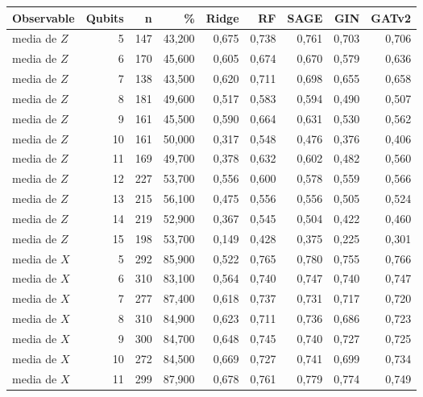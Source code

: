 \begin{table}[htbp]
    \centering
    {\footnotesize
    \begin{tabular}{@{}lrrrrrrrr@{}}
        \toprule
        \textbf{Observable} & \textbf{Qubits} & \textbf{n} & \textbf{\%} & \textbf{Ridge} & \textbf{RF} & \textbf{SAGE} & \textbf{GIN} & \textbf{GATv2} \\
        \midrule
        media de $Z$ & 5 & 147 & 43,200 & 0,675 & 0,738 & 0,761 & 0,703 & 0,706 \\
        media de $Z$ & 6 & 170 & 45,600 & 0,605 & 0,674 & 0,670 & 0,579 & 0,636 \\
        media de $Z$ & 7 & 138 & 43,500 & 0,620 & 0,711 & 0,698 & 0,655 & 0,658 \\
        media de $Z$ & 8 & 181 & 49,600 & 0,517 & 0,583 & 0,594 & 0,490 & 0,507 \\
        media de $Z$ & 9 & 161 & 45,500 & 0,590 & 0,664 & 0,631 & 0,530 & 0,562 \\
        media de $Z$ & 10 & 161 & 50,000 & 0,317 & 0,548 & 0,476 & 0,376 & 0,406 \\
        media de $Z$ & 11 & 169 & 49,700 & 0,378 & 0,632 & 0,602 & 0,482 & 0,560 \\
        media de $Z$ & 12 & 227 & 53,700 & 0,556 & 0,600 & 0,578 & 0,559 & 0,566 \\
        media de $Z$ & 13 & 215 & 56,100 & 0,475 & 0,556 & 0,556 & 0,505 & 0,524 \\
        media de $Z$ & 14 & 219 & 52,900 & 0,367 & 0,545 & 0,504 & 0,422 & 0,460 \\
        media de $Z$ & 15 & 198 & 53,700 & 0,149 & 0,428 & 0,375 & 0,225 & 0,301 \\
        media de $X$ & 5 & 292 & 85,900 & 0,522 & 0,765 & 0,780 & 0,755 & 0,766 \\
        media de $X$ & 6 & 310 & 83,100 & 0,564 & 0,740 & 0,747 & 0,740 & 0,747 \\
        media de $X$ & 7 & 277 & 87,400 & 0,618 & 0,737 & 0,731 & 0,717 & 0,720 \\
        media de $X$ & 8 & 310 & 84,900 & 0,623 & 0,711 & 0,736 & 0,686 & 0,723 \\
        media de $X$ & 9 & 300 & 84,700 & 0,648 & 0,745 & 0,740 & 0,727 & 0,725 \\
        media de $X$ & 10 & 272 & 84,500 & 0,669 & 0,727 & 0,741 & 0,699 & 0,734 \\
        media de $X$ & 11 & 299 & 87,900 & 0,678 & 0,761 & 0,779 & 0,774 & 0,749 \\

\end{tabular}}
\end{table}
